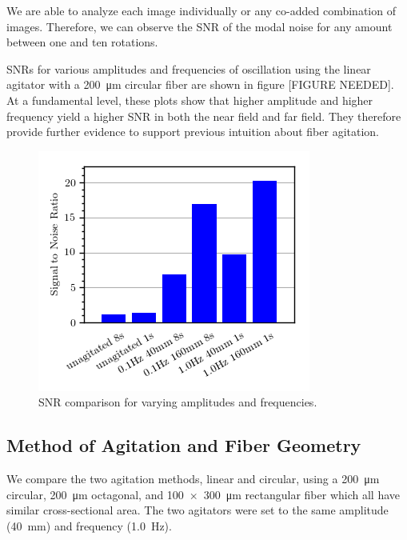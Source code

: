 \documentclass[twocolumn]{emulateapj}
\begin{document}
We are able to analyze each image individually or any co-added combination of images. Therefore, we can observe the SNR of the modal noise for any amount between one and ten rotations.
 
SNRs for various amplitudes and frequencies of oscillation using the linear agitator with a \SI{200}{\micro\meter} circular fiber are shown in figure [FIGURE NEEDED]. At a fundamental level, these plots show that higher amplitude and higher frequency yield a higher SNR in both the near field and far field. They therefore provide further evidence to support previous intuition about fiber agitation.

\begin{figure}
\centering
	\includegraphics[width=\columnwidth]{images/amp_freq_snr.png}
	\caption{SNR comparison for varying amplitudes and frequencies.}
\label{fig:amp_freq_snr}
\end{figure}

\subsection{Method of Agitation and Fiber Geometry}

We compare the two agitation methods, linear and circular, using a \SI{200}{\micro\meter} circular, \SI{200}{\micro\meter} octagonal, and \SI{100x300}{\micro\meter} rectangular fiber which all have similar cross-sectional area. The two agitators were set to the same amplitude (\SI{40}{\milli\meter}) and frequency (\SI{1.0}{\hertz}).
\end{document}
